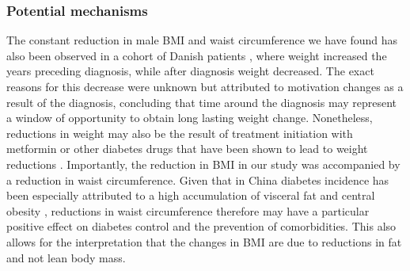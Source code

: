 \subsubsection*{Potential mechanisms}

The constant reduction in male \ac{BMI} and waist circumference we have found has also been observed in a cohort of Danish patients \autocite{DeFineOlivarius2015}, where weight increased the years preceding diagnosis, while after diagnosis weight decreased. The exact reasons for this decrease were unknown but attributed to motivation changes as a result of the diagnosis, concluding that time around the diagnosis may represent a window of opportunity to obtain long lasting weight change. Nonetheless, reductions in weight may also be the result of treatment initiation with metformin or other diabetes drugs that have been shown to lead to weight reductions \autocite{Yang2014}. Importantly, the reduction in \ac{BMI} in our study was accompanied by a reduction in waist circumference.  Given that in China diabetes incidence has been especially attributed to a high accumulation of visceral fat and central obesity \autocite{Ma2014}, reductions in waist circumference therefore may have a particular positive effect on diabetes control and the prevention of comorbidities. This also allows for the interpretation  that the changes in \ac{BMI} are due to reductions in fat and not lean body mass\autocite{Klein2007}.

